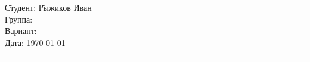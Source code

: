 \begin{tabbing}
	\hspace{11cm} \= Студент: \= Рыжиков Иван \\	%
	\> Группа:  \\	%
	\> Вариант:  \\		%
	\> Дата: \> \today		%
\end{tabbing}
\hrule
\vspace{1cm}